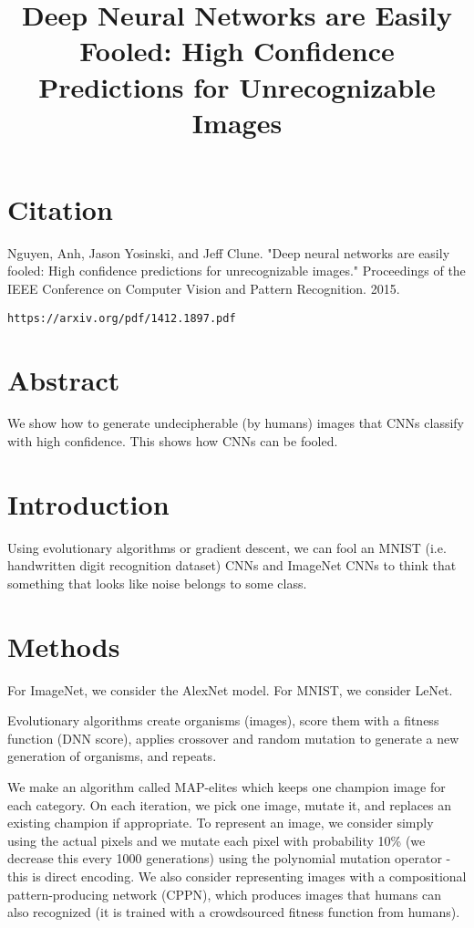 \documentclass[a4paper]{article}
\title{Deep Neural Networks are Easily Fooled:
High Confidence Predictions for Unrecognizable Images}
\date{}
\begin{document}
\maketitle

\section{Citation}
Nguyen, Anh, Jason Yosinski, and Jeff Clune. "Deep neural networks are easily fooled: High confidence predictions for unrecognizable images." Proceedings of the IEEE Conference on Computer Vision and Pattern Recognition. 2015.

\begin{verbatim}
https://arxiv.org/pdf/1412.1897.pdf
\end{verbatim}

\section{Abstract}
We show how to generate undecipherable (by humans) images that CNNs classify
with high confidence. This shows how CNNs can be fooled.

\section{Introduction}
Using evolutionary algorithms or gradient descent, we can fool an MNIST
(i.e. handwritten digit recognition dataset) CNNs and ImageNet CNNs to
think that something that looks like noise belongs to some class.

\section{Methods}
For ImageNet, we consider the AlexNet model. For MNIST, we consider LeNet.

Evolutionary algorithms create organisms (images), score them with a fitness
function (DNN score), applies crossover and random mutation to generate a
new generation of organisms, and repeats.

We make an algorithm called MAP-elites which keeps one champion image for each
category. On each iteration, we pick one image, mutate it, and replaces an
existing champion if appropriate. To represent an image, we consider simply
using the actual pixels and we mutate each pixel with probability 10\% (we
decrease this every 1000 generations) using the polynomial mutation operator
- this is direct encoding.
We also consider representing images with a compositional pattern-producing
network (CPPN), which produces images that humans can also recognized (it
is trained with a crowdsourced fitness function from humans).
\end{document}
